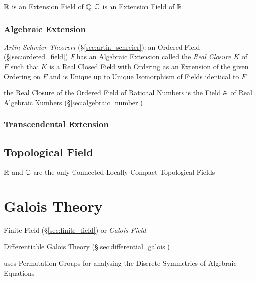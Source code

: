 \begin{itemize}
$\mathbb{R}$ is an Extension Field of $\mathbb{Q}$
$\mathbb{C}$ is an Extension Field of $\mathbb{R}$



\subsubsection{Algebraic Extension}\label{sec:algebraic_extension}

\emph{Artin-Schreier Theorem} (\S\ref{sec:artin_schreier}): an Ordered Field
(\S\ref{sec:ordered_field}) $F$ has an Algebraic Extension called the
\emph{Real Closure} $K$ of $F$ such that $K$ is a Real Closed Field with
Ordering as an Extension of the given Ordering on $F$ and is Unique up to
Unique Isomorphism of Fields identical to $F$

the Real Closure of the Ordered Field of Rational Numbers is the Field $\mathbb{A}$
of Real Algebraic Numbers (\S\ref{sec:algebraic_number})



\subsubsection{Transcendental Extension}
\label{sec:transcendental_extension}



\subsection{Topological Field}\label{sec:topological_field}

$\mathbb{R}$ and $\mathbb{C}$ are the only Connected Locally Compact
Topological Fields



\section{Galois Theory}\label{sec:galois_theory}

Finite Field (\S\ref{sec:finite_field}) or \emph{Galois Field}

Differentiable Galois Theory (\S\ref{sec:differential_galois})

uses Permutation Groups for analysing the Discrete Symmetries of
Algebraic Equations %


\end{itemize}

